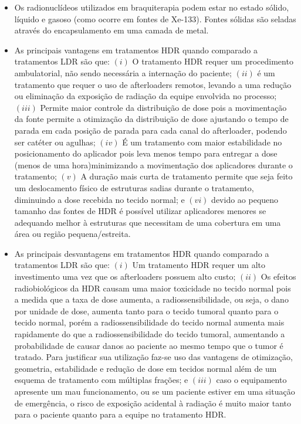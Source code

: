 \documentclass[11pt,a4paper]{article}
\newcounter{exemplo}
\begin{document}
\begin{exemplo}[Braquiterapia]
\begin{itemize}
        \item Os radionuclídeos utilizados em braquiterapia podem estar no estado sólido, líquido e gasoso (como ocorre em fontes de Xe-133). Fontes sólidas são seladas através do encapsulamento em uma camada de metal.
        
        \item As principais vantagens em tratamentos HDR quando comparado a tratamentos LDR são que: $(i)$ O tratamento HDR requer um procedimento ambulatorial, não sendo necessária a internação do paciente; $(ii)$ é um tratamento que requer o uso de afterloaders remotos, levando a uma redução ou eliminação da exposição de radiação da equipe envolvida no processo; $(iii)$ Permite maior controle da distribuição de dose pois a movimentação da fonte permite a otimização da distribuição de dose ajustando o tempo de parada em cada posição de parada para cada canal do afterloader, podendo ser catéter ou agulhas; $(iv)$ É um tratamento com maior estabilidade no posicionamento do aplicador pois leva menos tempo para entregar a dose (menos de uma hora)minimizando a movimentação dos aplicadores durante o tratamento;  $(v)$ A duração mais curta de tratamento permite que seja feito um deslocamento físico de estruturas sadias durante o tratamento, diminuindo a dose recebida no tecido normal; e $(vi)$ devido ao pequeno tamanho das fontes de HDR é possível utilizar aplicadores menores se adequando melhor à estruturas que necessitam de uma cobertura em uma área ou região pequena/estreita.
        

        \item As principais desvantagens em tratamentos HDR quando comparado a tratamentos LDR são que: $(i)$ Um tratamento HDR requer um alto investimento uma vez que os afterloaders possuem alto custo; $(ii)$ Os efeitos radiobiológicos da HDR causam uma maior toxicidade no tecido normal pois a medida que a taxa de dose aumenta, a radiossensibilidade, ou seja, o dano por unidade de dose, aumenta tanto para o tecido tumoral quanto para o tecido normal, porém a radiossensibilidade do tecido normal aumenta mais rapidamente do que a radiossensibilidade do tecido tumoral, aumentando a probabilidade de causar danos ao paciente ao mesmo tempo que o tumor é tratado. Para justificar sua utilização faz-se uso das vantagens de otimização, geometria, estabilidade e redução de dose em tecidos normal além de um esquema de tratamento com múltiplas frações; e $(iii)$ caso o equipamento apresente um mau funcionamento, ou se um paciente estiver em uma situação de emergência, o risco de exposição acidental à radiação é muito maior tanto para o paciente quanto para a equipe no tratamento HDR.
        

\end{itemize}
\end{exemplo}
\end{document}
